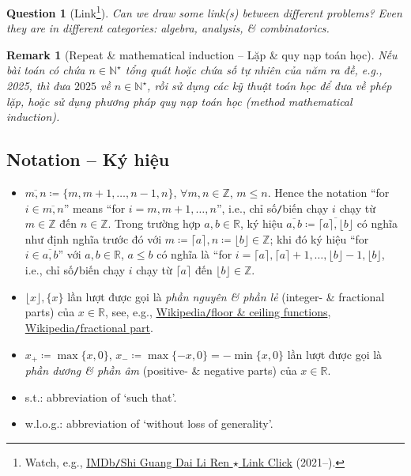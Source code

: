 \documentclass{article}
\newtheorem{question}{Question}
\newtheorem{remark}{Remark}
\begin{document}
\begin{question}[Link\footnote{Watch, e.g., \href{https://www.imdb.com/title/tt14976292/}{IMDb{\tt/}Shi Guang Dai Li Ren $\star$ Link Click} (2021--).}]
	Can we draw some link(s) between different problems? Even they are in different categories: algebra, analysis, \& combinatorics.
\end{question}

\begin{remark}[Repeat \& mathematical induction -- Lặp \& quy nạp toán học]
	\label{rmk: repeat}
	Nếu bài toán có chứa $n\in\mathbb{N}^\star$ tổng quát hoặc chứa số tự nhiên của năm ra đề, e.g., 2025, thì đưa $2025$ về $n\in\mathbb{N}^\star$, rồi sử dụng các kỹ thuật toán học để đưa về phép lặp, hoặc sử dụng phương pháp quy nạp toán học (method mathematical induction).
\end{remark}

\subsection*{Notation -- Ký hiệu}

\begin{itemize}
	\item $\overline{m,n}\coloneqq\{m,m + 1,\ldots,n - 1, n\}$, $\forall m,n\in\mathbb{Z}$, $m\le n$. Hence the notation ``for $i\in\overline{m,n}$'' means ``for $i = m,m + 1,\ldots,n$'', i.e., chỉ số{\tt/}biến chạy $i$ chạy từ $m\in\mathbb{Z}$ đến $n\in\mathbb{Z}$. Trong trường hợp $a,b\in\mathbb{R}$, ký hiệu $\overline{a,b}\coloneqq\overline{\lceil a\rceil,\lfloor b\rfloor}$ có nghĩa như định nghĩa trước đó với $m\coloneqq\lceil a\rceil,n\coloneqq\lfloor b\rfloor\in\mathbb{Z}$; khi đó ký hiệu ``for $i\in\overline{a,b}$'' với $a,b\in\mathbb{R}$, $a\le b$ có nghĩa là ``for $i = \lceil a\rceil,\lceil a\rceil + 1,\ldots,\lfloor b\rfloor - 1,\lfloor b\rfloor$, i.e., chỉ số{\tt/}biến chạy $i$ chạy từ $\lceil a\rceil$ đến $\lfloor b\rfloor\in\mathbb{Z}$.
	\item $\lfloor x\rfloor,\{x\}$ lần lượt được gọi là {\it phần nguyên \& phần lẻ} (integer- \& fractional parts) của $x\in\mathbb{R}$, see, e.g., \href{https://en.wikipedia.org/wiki/Floor_and_ceiling_functions}{Wikipedia{\tt/}floor \& ceiling functions}, \href{https://en.wikipedia.org/wiki/Fractional_part}{Wikipedia{\tt/}fractional part}.
	\item $x_+\coloneqq\max\{x,0\}$, $x_-\coloneqq\max\{-x,0\} = -\min\{x,0\}$ lần lượt được gọi là {\it phần dương \& phần âm} (positive- \& negative parts) của $x\in\mathbb{R}$.
	\item s.t.: abbreviation of `such that'.
	\item w.l.o.g.: abbreviation of `without loss of generality'.
\end{itemize}
\end{document}
